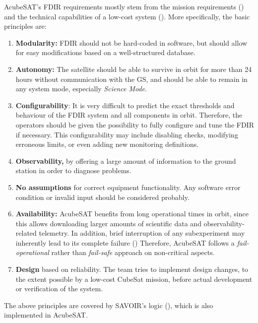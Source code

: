 \documentclass[a4paper,nobib]{tufte-book}
\begin{document}
AcubeSAT's \acs{FDIR} requirements mostly stem from the mission requirements () and the technical capabilities of a low-cost system (). More specifically, the basic principles are:
\begin{enumerate}
	\item \textbf{Modularity:} \acs{FDIR} should not be hard-coded in software, but should allow for easy modifications based on a well-structured database.
		\item \textbf{Autonomy:} The satellite should be able to survive in orbit for more than \SI{24}{} hours without communication with the \acs{GS}, and should be able to remain in any system mode, especially \emph{Science Mode}.
		\item \textbf{Configurability}: It is very difficult to predict the exact thresholds and behaviour of the \acs{FDIR} system and all components in orbit. Therefore, the operators should be given the possibility to fully configure and tune the \acs{FDIR} if necessary. This configurability may include disabling checks, modifying erroneous limits, or even adding new monitoring definitions.
		\item \textbf{Observability,} by offering a large amount of information to the ground station in order to diagnose problems.
		\item \textbf{No assumptions} for correct equipment functionality. Any software error condition or invalid input should be considered probably.
		\item \textbf{Availability:} AcubeSAT benefits from long operational times in orbit, since this allows downloading larger amounts of scientific data and observability-related telemetry. In addition, brief interruption of any subexperiment may inherently lead to its complete failure () Therefore, AcubeSAT follows a \emph{fail-operational} rather than \emph{fail-safe} approach on non-critical aspects.
		\item \textbf{Design} based on reliability. The team tries to implement design changes, to the extent possible by a low-cost CubeSat mission, before actual development or verification of the system.
	\end{enumerate}
	
The above principles are covered by \acs{SAVOIR}'s logic (), which is also implemented in AcubeSAT.
\end{document}
